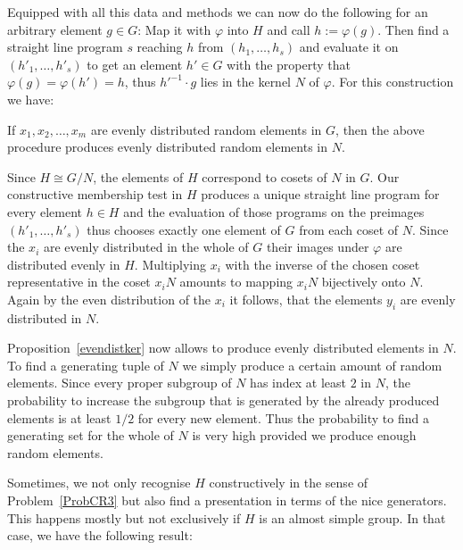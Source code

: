 Equipped with all this data and methods we can now do the following
for an arbitrary element $g \in G$: Map it with $\varphi$ into $H$
and call $h := \varphi(g)$. Then find a straight line program $s$ reaching
$h$ from $(h_1, \ldots, h_s)$ and evaluate it on $(h'_1, \ldots, h'_s)$
to get an element $h' \in G$ with the property that
$\varphi(g)=\varphi(h') = h$, thus $h'^{-1}\cdot g$ lies in the kernel $N$
of $\varphi$. For this construction we have:

\begin{Prop}
\label{evendistker}
If $x_1, x_2, \ldots, x_m$ are evenly distributed random elements in $G$,
then the above procedure produces evenly distributed random elements in
$N$.
\end{Prop}
\proofbeg
Since $H \cong G/N$, the elements of $H$ correspond to cosets of $N$ in
$G$. Our constructive membership test in $H$ produces a unique straight
line program for every element $h \in H$ and the evaluation of those
programs on the preimages $(h'_1, \ldots, h'_s)$ thus chooses exactly one
element of $G$ from each coset of $N$. Since the $x_i$ are evenly
distributed in the whole of $G$ their images under $\varphi$ are
distributed evenly in $H$. Multiplying $x_i$ with the inverse of the
chosen coset representative in the coset $x_iN$ amounts to mapping
$x_i N$ bijectively onto $N$. Again by the even distribution of the $x_i$
it follows, that the elements $y_i$ are evenly distributed in $N$.
\proofend

\smallskip
Proposition~\ref{evendistker} now allows to produce evenly distributed
elements in $N$. To find a generating tuple of $N$ we simply produce
a certain amount of random elements. Since every proper subgroup of $N$ 
has index at least $2$ in $N$, the probability to increase the
subgroup that is generated by the already produced elements is at least 
$1/2$ for every new element. Thus the probability to find a generating
set for the whole of $N$ is very high provided we produce enough random
elements.

\medskip
Sometimes, we not only recognise $H$ constructively in the sense of
Problem~\ref{ProbCR3} but also find a presentation in terms of the 
nice generators. This happens mostly but not exclusively if $H$ is an 
almost simple group. In that case, we have the following result:

